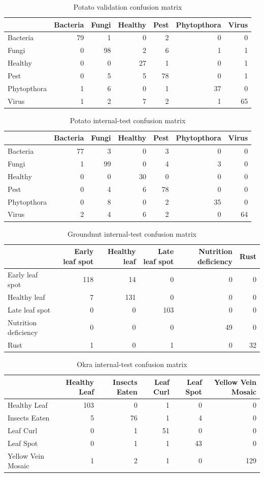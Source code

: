 \documentclass[12pt,a4paper,oneside]{report}
\begin{document}
\begin{table}[H]\centering\scriptsize\caption{Potato validation confusion matrix}\begin{tabular}{lrrrrrr}\toprule & Bacteria & Fungi & Healthy & Pest & Phytopthora & Virus\\\midrule Bacteria&79&1&0&2&0&0\\Fungi&0&98&2&6&1&1\\Healthy&0&0&27&1&0&1\\Pest&0&5&5&78&0&1\\Phytopthora&1&6&0&1&37&0\\Virus&1&2&7&2&1&65\\\bottomrule\end{tabular}\end{table}
\begin{table}[H]\centering\scriptsize\caption{Potato internal-test confusion matrix}\begin{tabular}{lrrrrrr}\toprule & Bacteria & Fungi & Healthy & Pest & Phytopthora & Virus\\\midrule Bacteria&77&3&0&3&0&0\\Fungi&1&99&0&4&3&0\\Healthy&0&0&30&0&0&0\\Pest&0&4&6&78&0&0\\Phytopthora&0&8&0&2&35&0\\Virus&2&4&6&2&0&64\\\bottomrule\end{tabular}\end{table}
\begin{table}[H]\centering\scriptsize\caption{Groundnut internal-test confusion matrix}\begin{tabular}{lrrrrr}\toprule & Early leaf spot & Healthy leaf & Late leaf spot & Nutrition deficiency & Rust\\\midrule Early leaf spot&118&14&0&0&0\\Healthy leaf&7&131&0&0&0\\Late leaf spot&0&0&103&0&0\\Nutrition deficiency&0&0&0&49&0\\Rust&1&0&1&0&32\\\bottomrule\end{tabular}\end{table}
\begin{table}[H]\centering\scriptsize\caption{Okra internal-test confusion matrix}\begin{tabular}{lrrrrr}\toprule & Healthy Leaf & Insects Eaten & Leaf Curl & Leaf Spot & Yellow Vein Mosaic\\\midrule Healthy Leaf&103&0&1&0&0\\Insects Eaten&5&76&1&4&0\\Leaf Curl&0&1&51&0&0\\Leaf Spot&0&1&1&43&0\\Yellow Vein Mosaic&1&2&1&0&129\\\bottomrule\end{tabular}\end{table}
\end{document}
